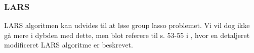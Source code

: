 %
%
%

\subsubsection{LARS}
LARS algoritmen kan udvides til at løse group lasso problemet.
Vi vil dog ikke gå mere i dybden med dette, men blot referere til s. 53-55 i \citep{group_lasso}, hvor en detaljeret modificeret LARS algoritme er beskrevet.
\newpage